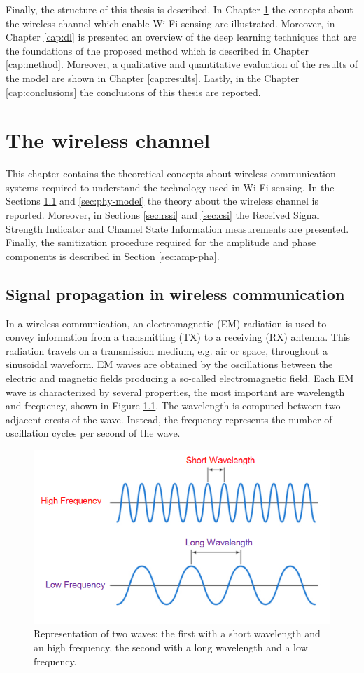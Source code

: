 \documentclass[binding=0.6cm,noexaminfo]{sapthesis}
\begin{document}
Finally, the structure of this thesis is described. In Chapter \ref{cap:wireless-chapter} the concepts about the wireless channel which enable Wi-Fi sensing are illustrated. Moreover, in Chapter \ref{cap:dl} is presented an overview of the deep learning techniques that are the foundations of the proposed method which is described in Chapter \ref{cap:method}. Moreover, a qualitative and quantitative evaluation of the results of the model are shown in Chapter \ref{cap:results}. Lastly, in the Chapter \ref{cap:conclusions} the conclusions of this thesis are reported.

\chapter{The wireless channel}\label{cap:wireless-chapter}

This chapter contains the theoretical concepts about wireless communication systems required to understand the technology used in Wi-Fi sensing. In the Sections \ref{sec:signal-prop} and \ref{sec:phy-model} the theory about the wireless channel is reported. Moreover, in Sections \ref{sec:rssi} and \ref{sec:csi} the Received Signal Strength Indicator and Channel State Information measurements are presented. Finally, the sanitization procedure required for the amplitude and phase components is described in Section \ref{sec:amp-pha}.

\section{Signal propagation in wireless communication}\label{sec:signal-prop}

In a wireless communication, an electromagnetic (EM) radiation is used to convey information from a transmitting (TX) to a receiving (RX) antenna. This radiation travels on a transmission medium, e.g. air or space, throughout a sinusoidal waveform. EM waves are obtained by the oscillations between the electric and magnetic fields producing a so-called electromagnetic field. Each EM wave is characterized by several properties, the most important are wavelength and frequency, shown in Figure \ref{fig:wave-pro}. The wavelength is computed between two adjacent crests of the wave. Instead, the frequency represents the number of oscillation cycles per second of the wave. 

\begin{figure}[h!]
\centering
\includegraphics[width=.7\linewidth]{wave-properties}
\caption{Representation of two waves: the first with a short wavelength and an high frequency, the second with a long wavelength and a low frequency.}
\label{fig:wave-pro}
\end{figure}
\end{document}
